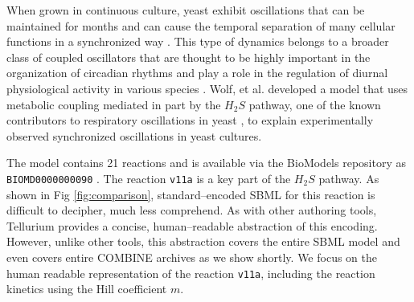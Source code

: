 \documentclass[10pt,letterpaper]{article}
\begin{document}
When grown in continuous culture, yeast exhibit oscillations that can be maintained for months and can cause the temporal separation of many cellular functions in a synchronized way \cite{murray2007regulation}. This type of dynamics belongs to a broader class of coupled oscillators that are thought to be highly important in the organization of circadian rhythms and play a role in the regulation of diurnal physiological activity in various species \cite{winfree1967biological,dodd2005plant}.
Wolf, et al. \cite{wolf2001mathematical} developed a model that uses metabolic coupling mediated in part by the $H_2 S$ pathway, one of the known contributors to respiratory oscillations in yeast \cite{murray2007regulation}, to explain experimentally observed synchronized oscillations in yeast cultures.

The model contains 21 reactions and is available via the BioModels repository as \texttt{BIOMD0000000090} \cite{wolfbiomod}. The reaction \texttt{v11a} is a key part of the $H_2S$ pathway. As shown in Fig  \ref{fig:comparison}, standard--encoded SBML for this reaction is difficult to decipher, much less comprehend. As with other authoring tools, Tellurium provides a concise, human--readable abstraction of this encoding. However, unlike other tools, this abstraction covers the entire SBML model and even covers entire COMBINE archives as we show shortly. We focus on the human readable representation of the reaction \texttt{v11a}, including the reaction kinetics using the Hill coefficient $m$.
\end{document}
